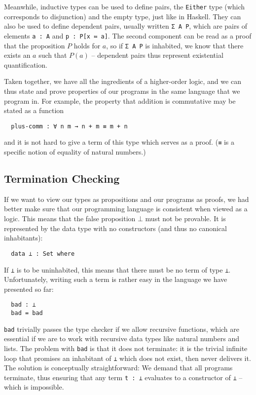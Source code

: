 \documentclass{scrartcl}
\newcommand*{\cod}[1]{\texttt{#1}}
\begin{document}
Meanwhile, inductive types can be used to define pairs, the \cod{Either} type
(which corresponds to disjunction) and the empty type, just like in Haskell.
They can also be used to define dependent pairs, usually written \cod{Σ A P},
which are pairs of elements \cod{a : A} and \cod{p : P[x ≔ a]}. The second
component can be read as a proof that the proposition $P$ holds for $a$, so if
\cod{Σ A P} is inhabited, we know that there exists an $a$ such that $P(a)$ --
dependent pairs thus represent existential quantification.

Taken together, we have all the ingredients of a higher-order logic, and we can
thus state and prove properties of our programs in the same language that we
program in. For example, the property that addition is commutative may be stated
as a function
\begin{verbatim}
  plus-comm : ∀ n m → n + m ≡ m + n
\end{verbatim}
and it is not hard to give a term of this type which serves as a proof.
(\cod{≡} is a specific notion of equality of natural numbers.)


\subsection{Termination Checking}

If we want to view our types as propositions and our programs as proofs, we had
better make sure that our programming language is consistent when viewed as a
logic. This means that the false proposition $⊥$ must not be provable. It is
represented by the data type with no constructors (and thus no canonical
inhabitants):
\begin{verbatim}
  data ⊥ : Set where
\end{verbatim}

If \cod{⊥} is to be uninhabited, this means that there must be no term of type
\cod{⊥}. Unfortunately, writing such a term is rather easy in the language we
have presented so far:
\begin{verbatim}
  bad : ⊥
  bad = bad
\end{verbatim}
\cod{bad} trivially passes the type checker if we allow recursive functions,
which are essential if we are to work with recursive data types like natural
numbers and lists. The problem with \cod{bad} is that it does not terminate: it
is the trivial infinite loop that promises an inhabitant of \cod{⊥} which does
not exist, then never delivers it. The solution is conceptually straightforward:
We demand that all programs terminate, thus ensuring that any term \cod{t : ⊥}
evaluates to a constructor of \cod{⊥} -- which is impossible.
\end{document}

